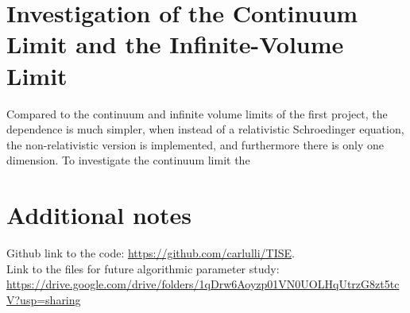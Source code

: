 \documentclass{article}
\begin{document}
\section{Investigation of the Continuum Limit and the Infinite-Volume Limit}\label{finitevolume}
Compared to the continuum and infinite volume limits of the first project, the dependence is much simpler, when instead of a relativistic Schroedinger equation, the non-relativistic version is implemented, and furthermore there is only one dimension. 
To investigate the continuum limit the 





\clearpage
\section{Additional notes}
Github link to the code: \hyperlink{https://github.com/carlulli/TISE}{https://github.com/carlulli/TISE}.\\
Link to the files for future algorithmic parameter study:\\
\hyperlink{https://drive.google.com/drive/folders/1qDrw6Aoyzp01VN0UOLHqUtrzG8zt5tcV?usp=sharing}{https://drive.google.com/drive/folders/1qDrw6Aoyzp01VN0UOLHqUtrzG8zt5tcV?usp=sharing}

\end{document}
